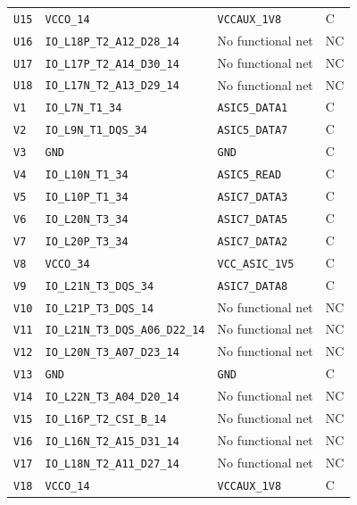 \documentclass[10pt,a4paper]{article}
\begin{document}
\begin{longtable}{@{}P{15mm}P{42mm}P{92mm}P{10mm}@{}}
\nolinkurl{U15} & \nolinkurl{VCCO_14} & \nolinkurl{VCCAUX_1V8} & C \\
\nolinkurl{U16} & \nolinkurl{IO_L18P_T2_A12_D28_14} & No functional net & NC \\
\nolinkurl{U17} & \nolinkurl{IO_L17P_T2_A14_D30_14} & No functional net & NC \\
\nolinkurl{U18} & \nolinkurl{IO_L17N_T2_A13_D29_14} & No functional net & NC \\
\nolinkurl{V1} & \nolinkurl{IO_L7N_T1_34} & \nolinkurl{ASIC5_DATA1} & C \\
\nolinkurl{V2} & \nolinkurl{IO_L9N_T1_DQS_34} & \nolinkurl{ASIC5_DATA7} & C \\
\nolinkurl{V3} & \nolinkurl{GND} & \nolinkurl{GND} & C \\
\nolinkurl{V4} & \nolinkurl{IO_L10N_T1_34} & \nolinkurl{ASIC5_READ} & C \\
\nolinkurl{V5} & \nolinkurl{IO_L10P_T1_34} & \nolinkurl{ASIC7_DATA3} & C \\
\nolinkurl{V6} & \nolinkurl{IO_L20N_T3_34} & \nolinkurl{ASIC7_DATA5} & C \\
\nolinkurl{V7} & \nolinkurl{IO_L20P_T3_34} & \nolinkurl{ASIC7_DATA2} & C \\
\nolinkurl{V8} & \nolinkurl{VCCO_34} & \nolinkurl{VCC_ASIC_1V5} & C \\
\nolinkurl{V9} & \nolinkurl{IO_L21N_T3_DQS_34} & \nolinkurl{ASIC7_DATA8} & C \\
\nolinkurl{V10} & \nolinkurl{IO_L21P_T3_DQS_14} & No functional net & NC \\
\nolinkurl{V11} & \nolinkurl{IO_L21N_T3_DQS_A06_D22_14} & No functional net & NC \\
\nolinkurl{V12} & \nolinkurl{IO_L20N_T3_A07_D23_14} & No functional net & NC \\
\nolinkurl{V13} & \nolinkurl{GND} & \nolinkurl{GND} & C \\
\nolinkurl{V14} & \nolinkurl{IO_L22N_T3_A04_D20_14} & No functional net & NC \\
\nolinkurl{V15} & \nolinkurl{IO_L16P_T2_CSI_B_14} & No functional net & NC \\
\nolinkurl{V16} & \nolinkurl{IO_L16N_T2_A15_D31_14} & No functional net & NC \\
\nolinkurl{V17} & \nolinkurl{IO_L18N_T2_A11_D27_14} & No functional net & NC \\
\nolinkurl{V18} & \nolinkurl{VCCO_14} & \nolinkurl{VCCAUX_1V8} & C \\
\end{longtable}\endgroup
\end{document}
